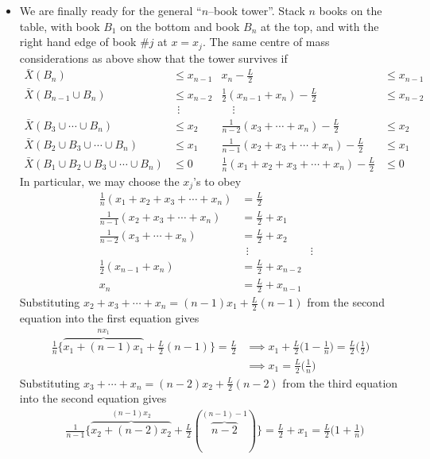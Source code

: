 \begin{itemize}
\item
We are finally ready for the general ``$n$--book tower''.
Stack $n$ books on the table,
with book $B_1$ on the bottom and book $B_n$ at the top, and
with the right hand edge of book \#$j$ at $x=x_j$. The same
centre of mass considerations as above show that the tower survives
if
\begin{align*}
\bar X(B_n) &\le x_{n-1} &
x_n-\frac{L}{2}&\le x_{n-1} \\
%
\bar X(B_{n-1}\cup B_n) &\le x_{n-2} &
\frac{1}{2}(x_{n-1}+x_n)-\frac{L}{2}&\le x_{n-2} \\
%
&\ \ \vdots &\quad\vdots \\
%
\bar X(B_3\cup\cdots\cup B_n) &\le x_2&
\frac{1}{n-2}(x_3+\cdots+x_n)-\frac{L}{2}&\le x_2 \\
%
\bar X(B_2\cup B_3\cup\cdots\cup B_n) &\le x_1&
\frac{1}{n-1}(x_2+x_3+\cdots+x_n)-\frac{L}{2}&\le x_1 \\
%
\bar X(B_1\cup B_2\cup B_3\cup\cdots\cup B_n) &\le 0 &
\frac{1}{n}(x_1+x_2+x_3+\cdots+x_n)-\frac{L}{2}&\le 0
\end{align*}
In particular, we may choose the $x_j$'s to obey
\begin{align*}
\frac{1}{n}(x_1+x_2+x_3+\cdots+x_n)& = \frac{L}{2} \\
\frac{1}{n-1}(x_2+x_3+\cdots+x_n)&= \frac{L}{2} + x_1 \\
\frac{1}{n-2}(x_3+\cdots+x_n)&= \frac{L}{2}  + x_2 \\
&\ \ \vdots &\vdots& \\
\frac{1}{2}(x_{n-1}+x_n)&= \frac{L}{2} + x_{n-2} \\
x_n&= \frac{L}{2} + x_{n-1}
\end{align*}
Substituting $x_2+x_3+\cdots+x_n=(n-1) x_1  +\frac{L}{2}(n-1)$
from the second equation into the first
equation gives
\begin{align*}
\frac{1}{n}\Big\{\overbrace{x_1+(n-1) x_1}^{nx_1}
                  +\frac{L}{2}(n-1)\Big\} = \frac{L}{2}
&\implies x_1 +\frac{L}{2}\Big(1-\frac{1}{n}\Big)
           = \frac{L}{2}\Big(\frac{1}{2}\Big) \\
&\implies x_1 = \frac{L}{2}\Big(\frac{1}{n}\Big)
\end{align*}
Substituting $x_3+\cdots+x_n=(n-2) x_2+\frac{L}{2}(n-2)$ from the
third equation into the second
equation gives
\begin{align*}
&\frac{1}{n-1}\Big\{\overbrace{x_2+(n-2) x_2}^{(n-1)x_2}
      +\frac{L}{2}(\overbrace{n-2}^{(n-1)-1})\Big\} = \frac{L}{2} +x_1
=\frac{L}{2}\Big(1+\frac{1}{n}\Big) \\

\end{align*}
\end{itemize}
